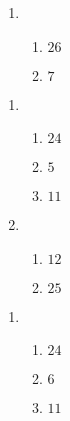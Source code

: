 \documentclass[12pt,twoside]{article}
\makeatletter
\def\emptycleardoublepage{\clearpage\if@twoside \ifodd\c@page\else
\thispagestyle{empty}%
\hbox{}\newpage\if@twocolumn\hbox{}\newpage\fi\fi\fi}
\makeatother
\begin{document}
\begin{multicols}{2}
\begin{enumerate}
\item \begin{enumerate}
\def \a{8}\def \b{18}\def \apb{26}
\item $\apb$
\def \a{12}\def \dif{7}\def \b{5}
\item $\dif$
\def \vshift{-5}\def \hshift{2}\def \chang{2}\def \findval{4}\def \yval{-9}
\end{enumerate}
\end{enumerate}\end{multicols}\emptycleardoublepage{}\graphicspath{{C:/Users/iainc/anaconda3/Randomizer/Sample Course/Sample Assessment 2/}}\begin{multicols}{2} \begin{enumerate}
\item \begin{enumerate}
\def \a{6}\def \b{18}\def \apb{24}
\item $\apb$
\def \a{13}\def \dif{5}\def \b{8}
\item $\dif$
\def \a{2}\def \b{9}\def \ab{11}
\item $\ab$
\def \vshift{-5}\def \hshift{4}\def \chang{1}\def \findval{5}\def \yval{-7}
\end{enumerate}

\item \begin{enumerate}
\def \a{3}\def \b{9}\def \ab{12}
\item $\ab$
\def \a{9}\def \b{16}\def \apb{25}
\item $\apb$
\def \vshift{3}\def \hshift{0}\def \chang{-2}\def \findval{-2}\def \yval{7}
\end{enumerate}
\end{enumerate}\end{multicols}\emptycleardoublepage{}\graphicspath{{C:/Users/iainc/anaconda3/Randomizer/Sample Course/Sample Assessment 2/}}\begin{multicols}{2} \begin{enumerate}
\item \begin{enumerate}
\def \a{7}\def \b{17}\def \apb{24}
\item $\apb$
\def \a{11}\def \dif{6}\def \b{5}
\item $\dif$
\def \a{5}\def \b{6}\def \ab{11}
\item $\ab$
\def \vshift{1}\def \hshift{-2}\def \chang{0}\def \findval{-2}\def \yval{1}
\end{enumerate}


\end{enumerate}
\end{multicols}
\end{document}
